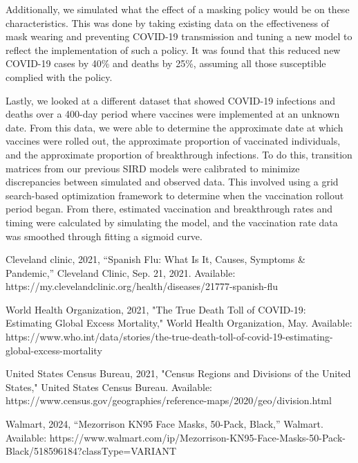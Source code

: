 \documentclass[conference]{IEEEtran}
\begin{document}
Additionally, we simulated what the effect of a masking policy would be on these characteristics. This was done by taking existing data on the effectiveness of mask wearing and preventing COVID-19 transmission and tuning a new model to reflect the implementation of such a policy. It was found that this reduced new COVID-19 cases by 40\% and deaths by 25\%, assuming all those susceptible complied with the policy. 

Lastly, we looked at a different dataset that showed COVID-19 infections and deaths over a 400-day period where vaccines were implemented at an unknown date. From this data, we were able to determine the approximate date at which vaccines were rolled out, the approximate proportion of vaccinated individuals, and the approximate proportion of breakthrough infections. To do this, transition matrices from our previous SIRD models were calibrated to minimize discrepancies between simulated and observed data. This involved using a grid search-based optimization framework to determine when the vaccination rollout period began. From there, estimated vaccination and breakthrough rates and timing were calculated by simulating the model, and the vaccination rate data was smoothed through fitting a sigmoid curve.

\begin{thebibliography}{00}

Cleveland clinic, 2021, “Spanish Flu: What Is It, Causes, Symptoms \& Pandemic,” Cleveland Clinic, Sep. 21, 2021. Available: https://my.clevelandclinic.org/health/diseases/21777-spanish-flu

World Health Organization, 2021, "The True Death Toll of COVID-19: Estimating Global Excess Mortality," World Health Organization, May. Available: https://www.who.int/data/stories/the-true-death-toll-of-covid-19-estimating-global-excess-mortality

United States Census Bureau, 2021, "Census Regions and Divisions of the United States," United States Census Bureau. Available: https://www.census.gov/geographies/reference-maps/2020/geo/division.html

Walmart, 2024, “Mezorrison KN95 Face Masks, 50-Pack, Black,” Walmart. Available: https://www.walmart.com/ip/Mezorrison-KN95-Face-Masks-50-Pack-Black/518596184?classType=VARIANT

\end{thebibliography}
\end{document}
